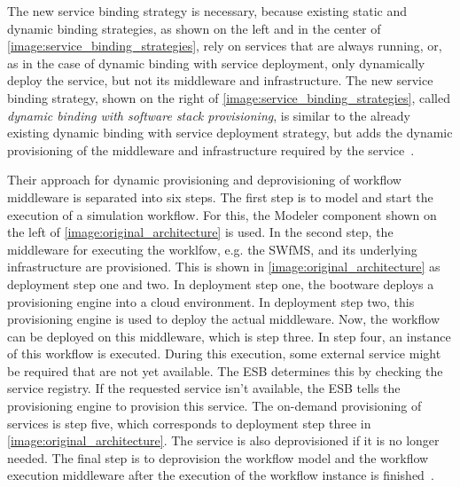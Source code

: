 The new service binding strategy is necessary, because existing static and dynamic binding strategies, as shown on the left and in the center of \autoref{image:service_binding_strategies}, rely on services that are always running, or, as in the case of dynamic binding with service deployment, only dynamically deploy the service, but not its middleware and infrastructure.
The new service binding strategy, shown on the right of \autoref{image:service_binding_strategies}, called \textit{dynamic binding with software stack provisioning}, is similar to the already existing dynamic binding with service deployment strategy, but adds the dynamic provisioning of the middleware and infrastructure required by the service~\autocite{provisioning:ondemand}.

Their approach for dynamic provisioning and deprovisioning of workflow middleware is separated into six steps.
The first step is to model and start the execution of a simulation workflow.
For this, the Modeler component shown on the left of \autoref{image:original_architecture} is used.
In the second step, the middleware for executing the worklfow, e.g. the SWfMS, and its underlying infrastructure are provisioned.
This is shown in \autoref{image:original_architecture} as deployment step one and two.
In deployment step one, the bootware deploys a provisioning engine into a cloud environment.
In deployment step two, this provisioning engine is used to deploy the actual middleware.
Now, the workflow can be deployed on this middleware, which is step three.
In step four, an instance of this workflow is executed.
During this execution, some external service might be required that are not yet available.
The ESB determines this by checking the service registry.
If the requested service isn't available, the ESB tells the provisioning engine to provision this service.
The on-demand provisioning of services is step five, which corresponds to deployment step three in \autoref{image:original_architecture}.
The service is also deprovisioned if it is no longer needed.
The final step is to deprovision the workflow model and the workflow execution middleware after the execution of the workflow instance is finished~\autocite{provisioning:ondemand}.

